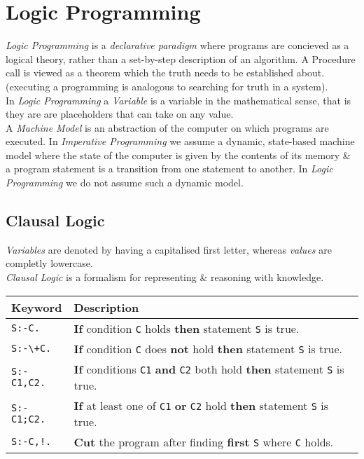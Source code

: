 \documentclass[11pt,a4paper]{article}
\begin{document}
\section{Logic Programming}

\textit{Logic Programming} is a \textit{declarative paradigm} where programs are concieved as a logical theory, rather than a set-by-step description of an algorithm. A Procedure call is viewed as a theorem which the truth needs to be established about. (\ie executing a programming is analogous to searching for truth in a system).\\

In \textit{Logic Programming} a \textit{Variable} is a variable in the mathematical sense, that is they are are placeholders that can take on any value.\\

A \textit{Machine Model} is an abstraction of the computer on which programs are executed. In \textit{Imperative Programming} we assume a dynamic, state-based machine model where the state of the computer is given by the contents of its memory \& a program statement is a transition from one statement to another. In \textit{Logic Programming} we do not assume such a dynamic model.

\subsection{Clausal Logic}

\textit{Variables} are denoted by having a capitalised first letter, whereas \textit{values} are completly lowercase.\\

\textit{Clausal Logic} is a formalism for representing \& reasoning with knowledge.
\begin{center}
\begin{tabular}{l|l}
\textbf{Keyword}&\textbf{Description}\\
\hline
{\lstinline!S:-C.!}&\textbf{If} condition {\lstinline!C!} holds \textbf{then} statement {\lstinline!S!} is true.\\
{\lstinline!S:-\+C.!}&\textbf{If} condition {\lstinline!C!} does \textbf{not} hold \textbf{then} statement {\lstinline!S!} is true.\\
{\lstinline!S:-C1,C2.!}&\textbf{If} conditions {\lstinline!C1!} \textbf{and} {\lstinline!C2!} both hold \textbf{then} statement {\lstinline!S!} is true.\\
{\lstinline!S:-C1;C2.!}&\textbf{If} at least one of {\lstinline!C1!} \textbf{or} {\lstinline!C2!} hold \textbf{then} statement {\lstinline!S!} is true.\\
{\lstinline|S:-C,!.|}&\textbf{Cut} the program after finding \textbf{first} \lstinline!S! where \lstinline!C! holds.
\end{tabular}
\end{center}
\end{document}
